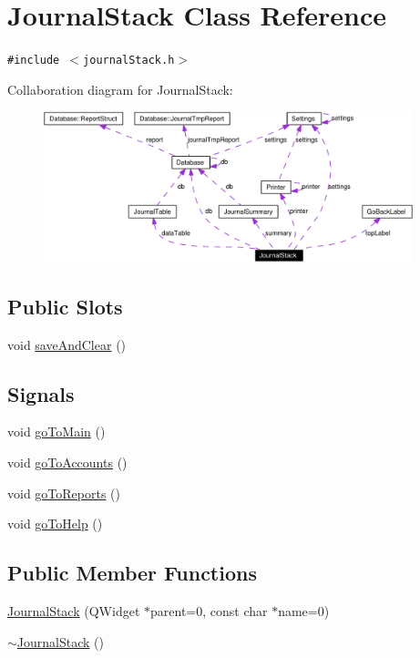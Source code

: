 \hypertarget{classJournalStack}{
\section{Journal\-Stack Class Reference}
\label{classJournalStack}
}
{\tt \#include $<$journal\-Stack.h$>$}

Collaboration diagram for Journal\-Stack:\begin{figure}[H]
\begin{center}
\leavevmode
\includegraphics[width=304pt]{classJournalStack__coll__graph}
\end{center}
\end{figure}
\subsection*{Public Slots}
\begin{CompactItemize}
\item 
void \hyperlink{classJournalStack_i0}{save\-And\-Clear} ()
\end{CompactItemize}
\subsection*{Signals}
\begin{CompactItemize}
\item 
void \hyperlink{classJournalStack_l0}{go\-To\-Main} ()
\item 
void \hyperlink{classJournalStack_l1}{go\-To\-Accounts} ()
\item 
void \hyperlink{classJournalStack_l2}{go\-To\-Reports} ()
\item 
void \hyperlink{classJournalStack_l3}{go\-To\-Help} ()
\end{CompactItemize}
\subsection*{Public Member Functions}
\begin{CompactItemize}
\item 
\hyperlink{classJournalStack_a0}{Journal\-Stack} (QWidget $\ast$parent=0, const char $\ast$name=0)
\item 
\hyperlink{classJournalStack_a1}{$\sim$Journal\-Stack} ()
\end{CompactItemize}

